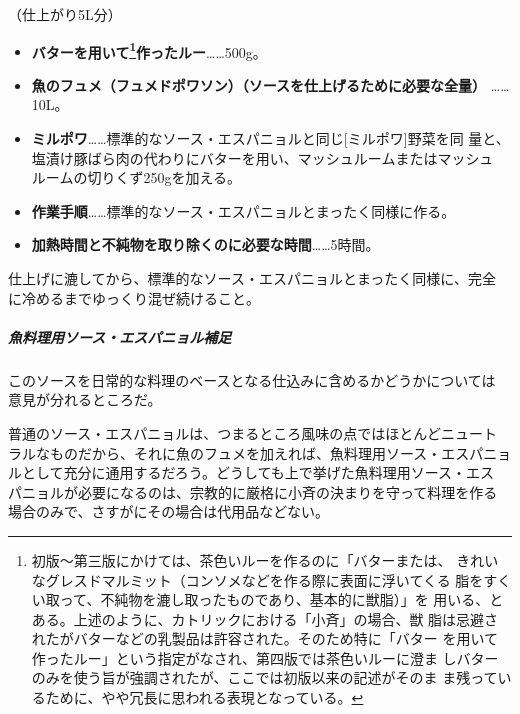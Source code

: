 \begin{recette}
（仕上がり5L分）

\begin{itemize}
\item
  \textbf{バターを用いて\footnote{初版〜第三版にかけては、茶色いルーを作るのに「バターまたは、
    きれいなグレスドマルミット（コンソメなどを作る際に表面に浮いてくる
    脂をすくい取って、不純物を漉し取ったものであり、基本的に獣脂）」を
    用いる、とある。上述のように、カトリックにおける「小斉」の場合、獣
    脂は忌避されたがバターなどの乳製品は許容された。そのため特に「バター
    を用いて作ったルー」という指定がなされ、第四版では茶色いルーに澄ま
    しバターのみを使う旨が強調されたが、ここでは初版以来の記述がそのま
    ま残っているために、やや冗長に思われる表現となっている。}作ったルー}\ldots{}\ldots{}500g。
\item
  \textbf{魚のフュメ（フュメドポワソン）（ソースを仕上げるために必要な全量）
  }\ldots{}\ldots{}10L。
\item
  \textbf{ミルポワ}\ldots{}\ldots{}標準的なソース・エスパニョルと同じ{[}ミルポワ{]}野菜を同
  量と、塩漬け豚ばら肉の代わりにバターを用い、マッシュルームまたはマッシュ
  ルームの切りくず250gを加える。
\item
  \textbf{作業手順}\ldots{}\ldots{}標準的なソース・エスパニョルとまったく同様に作る。
\item
  \textbf{加熱時間と不純物を取り除くのに必要な時間}\ldots{}\ldots{}5時間。
\end{itemize}

仕上げに漉してから、標準的なソース・エスパニョルとまったく同様に、完全
に冷めるまでゆっくり混ぜ続けること。

\maeaki

\hypertarget{ux9b5aux6599ux7406ux7528ux30bdux30fcux30b9ux30a8ux30b9ux30d1ux30cbux30e7ux30ebux88dcux8db3}{%
\subparagraph{魚料理用ソース・エスパニョル補足}\label{ux9b5aux6599ux7406ux7528ux30bdux30fcux30b9ux30a8ux30b9ux30d1ux30cbux30e7ux30ebux88dcux8db3}}

 

このソースを日常的な料理のベースとなる仕込みに含めるかどうかについては
意見が分れるところだ。

普通のソース・エスパニョルは、つまるところ風味の点ではほとんどニュート
ラルなものだから、それに魚のフュメを加えれば、魚料理用ソース・エスパニョ
ルとして充分に通用するだろう。どうしても上で挙げた魚料理用ソース・エス
パニョルが必要になるのは、宗教的に厳格に小斉の決まりを守って料理を作る
場合のみで、さすがにその場合は代用品などない。


\end{recette}
